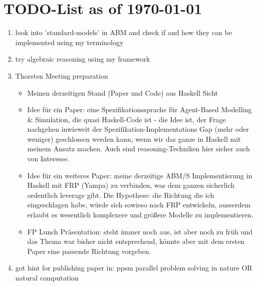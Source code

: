 \section{TODO-List as of \today}

\begin{enumerate}

\item look into 'standard-models' in ABM and check if and how they can be implemented using my terminology

\item try algebraic reasoning using my framework

\item Thorsten Meeting preparation
\begin{itemize}
	\item Meinen derzeitigen Stand (Paper und Code) aus Haskell Sicht
	\item Idee für ein Paper: eine Spezifikationssprache für Agent-Based Modelling \& Simulation, die quasi Haskell-Code ist - die Idee ist, der Frage nachgehen inwieweit der Spezifikation-Implementations Gap (mehr oder weniger) geschlossen werden kann, wenn wir das ganze in Haskell mit meinem Ansatz machen. Auch sind reasoning-Techniken hier sicher auch von Interesse.
	\item Idee für ein weiteres Paper: meine derzeitige ABM/S Implementierung in Haskell mit FRP (Yampa) zu verbinden, was dem ganzen sicherlich ordentlich leverage gibt. Die Hypothese: die Richtung die ich eingeschlagen habe, würde sich sowieso nach FRP entwickeln, ausserdem erlaubt es wesentlich komplexere und größere Modelle zu implementieren.
	\item FP Lunch Präsentation: steht immer noch aus, ist aber noch zu früh und das Thema war bisher nicht entsprechend, könnte aber mit dem ersten Paper eine passende Richtung vorgeben.
\end{itemize}

\item got hint for publishing paper in: ppsm parallel problem solving in nature OR natural computation


\end{enumerate}
